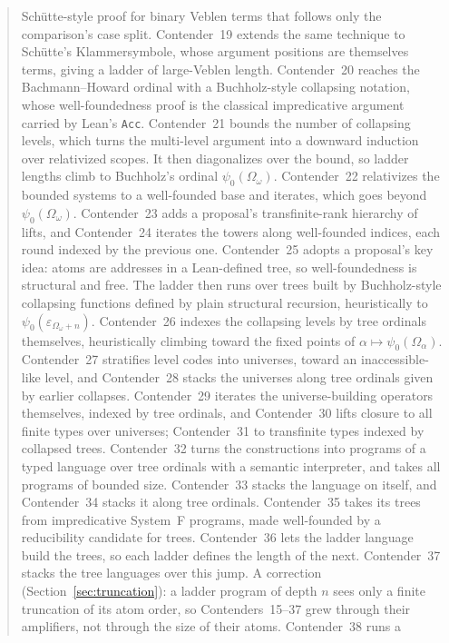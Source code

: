 \documentclass[11pt]{article}
\theoremstyle{definition}
\theoremstyle{remark}
\newcommand{\lean}[1]{\texttt{#1}}
\begin{document}
\begin{abstract}
Schütte-style proof for binary Veblen terms that follows only the comparison's
case split. Contender~19 extends the same technique to Schütte's Klammersymbole,
whose argument positions are themselves terms, giving a ladder of
large-Veblen length. Contender~20 reaches the Bachmann--Howard ordinal with a
Buchholz-style collapsing notation, whose well-foundedness proof is the
classical impredicative argument carried by Lean's \lean{Acc}. Contender~21
bounds the number of collapsing levels, which turns the multi-level argument
into a downward induction over relativized scopes. It then diagonalizes over the
bound, so ladder lengths climb to Buchholz's ordinal $\psi_0(\Omega_\omega)$.
Contender~22 relativizes the bounded systems to a well-founded base and
iterates, which goes beyond $\psi_0(\Omega_\omega)$. Contender~23 adds a
proposal's transfinite-rank hierarchy of lifts, and Contender~24 iterates the
towers along well-founded indices, each round indexed by the previous one.
Contender~25 adopts a proposal's key idea: atoms are addresses in a Lean-defined
tree, so well-foundedness is structural and free. The ladder then runs over
trees built by Buchholz-style collapsing functions defined by plain structural
recursion, heuristically to $\psi_0(\varepsilon_{\Omega_\omega+n})$.
Contender~26 indexes the collapsing levels by tree ordinals themselves,
heuristically climbing toward the fixed points of $\alpha\mapsto\psi_0(\Omega_\alpha)$.
Contender~27 stratifies level codes into universes, toward an inaccessible-like
level, and Contender~28 stacks the universes along tree ordinals given by
earlier collapses. Contender~29 iterates the universe-building operators
themselves, indexed by tree ordinals, and Contender~30 lifts closure to all
finite types over universes; Contender~31 to transfinite types indexed by
collapsed trees. Contender~32 turns the constructions into programs of a typed
language over tree ordinals with a semantic interpreter, and takes all programs of
bounded size. Contender~33 stacks the language on itself, and Contender~34 stacks
it along tree ordinals. Contender~35 takes its trees from impredicative System~F
programs, made well-founded by a reducibility candidate for trees. Contender~36
lets the ladder language build the trees, so each ladder defines the length of
the next. Contender~37 stacks the tree languages over this jump. A correction
(Section~\ref{sec:truncation}): a ladder program of depth $n$ sees only a finite
truncation of its atom order, so Contenders~15--37 grew through their
amplifiers, not through the size of their atoms. Contender~38 runs a

\end{abstract}
\end{document}
